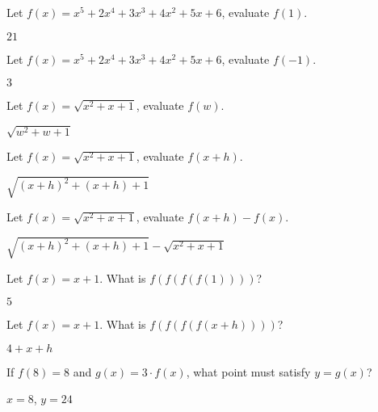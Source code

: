 \begin{exercises}
\begin{exercise} Let $f(x) = x^5+2x^4+3x^3+4x^2+5x+6$, evaluate $f(1)$.
\begin{answer}
$21$
\end{answer}
\end{exercise}

\begin{exercise} Let $f(x) = x^5+2x^4+3x^3+4x^2+5x+6$, evaluate $f(-1)$.
\begin{answer}
$3$
\end{answer}
\end{exercise}

\begin{exercise} Let $f(x) =\sqrt{x^2+x+1}$, evaluate $f(w)$.
\begin{answer}
$\sqrt{w^2+w+1}$
\end{answer}
\end{exercise}

\begin{exercise} Let $f(x) =\sqrt{x^2+x+1}$, evaluate $f(x+h)$.
\begin{answer}
$\sqrt{(x+h)^2+(x+h)+1}$
\end{answer}
\end{exercise}

\begin{exercise} Let $f(x) = \sqrt{x^2+x+1}$, evaluate $f(x+h) - f(x)$.
\begin{answer}
$\sqrt{(x+h)^2+(x+h)+1} - \sqrt{x^2+x+1}$
\end{answer}
\end{exercise}

\begin{exercise} Let $f(x) = x+1$. What is $f(f(f(f(1))))$?
\begin{answer}
$5$
\end{answer}
\end{exercise}

\begin{exercise} Let $f(x) = x+1$. What is $f(f(f(f(x+h))))$?
\begin{answer}
$4+x+h$
\end{answer}
\end{exercise}

\begin{exercise} 
If $f(8) = 8$ and $g(x)=3\cdot f(x)$, what point must satisfy $y=g(x)$?
\begin{answer}
$x=8$, $y=24$
\end{answer}
\end{exercise}


\end{exercises}
